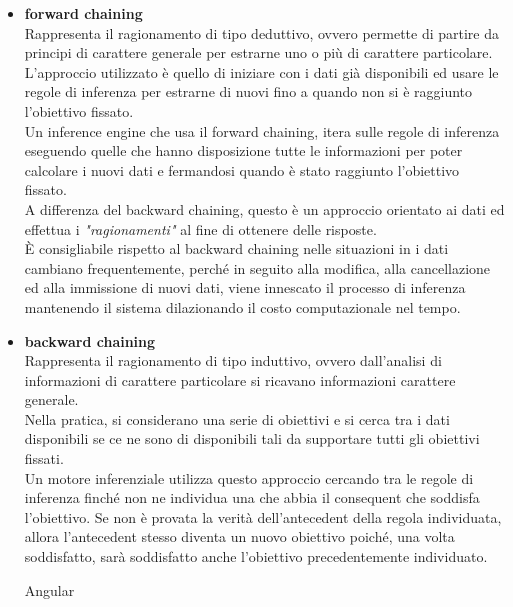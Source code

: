 \begin{itemize}
	\item \textbf{forward chaining} \\
	 Rappresenta il ragionamento di tipo deduttivo, ovvero permette di partire da principi di carattere generale per estrarne uno o più di carattere particolare.\\
	 L'approccio utilizzato è quello di iniziare con i dati già disponibili ed usare le regole di inferenza per estrarne di nuovi fino a quando non si è raggiunto l'obiettivo fissato.\\
	 Un inference engine che usa il forward chaining, itera sulle regole di inferenza eseguendo quelle che hanno disposizione tutte le informazioni per poter calcolare i nuovi dati  e fermandosi quando è stato raggiunto l'obiettivo fissato.  \\
	 A differenza del backward chaining, questo è un approccio orientato ai dati ed effettua i \textit{"ragionamenti"} al fine di ottenere delle risposte. \\
	 È consigliabile rispetto al backward chaining nelle situazioni in i dati cambiano frequentemente, perché in seguito alla modifica, alla cancellazione ed alla immissione di nuovi dati, viene innescato il processo di inferenza mantenendo il sistema dilazionando il costo computazionale nel tempo.
 
 \item \textbf{backward chaining} \\
		 Rappresenta il ragionamento di tipo induttivo, ovvero dall'analisi di informazioni di carattere particolare si ricavano informazioni carattere generale. \\
		 Nella pratica, si considerano una serie di obiettivi e si cerca tra i dati disponibili se ce ne sono di disponibili tali da supportare tutti gli obiettivi fissati.\\
		 Un motore inferenziale utilizza questo approccio cercando tra le regole di inferenza finché non ne individua una che abbia il consequent che soddisfa l'obiettivo.
		 Se non è provata la verità dell'antecedent della regola individuata, allora l'antecedent stesso diventa un nuovo obiettivo poiché, una volta soddisfatto, sarà soddisfatto anche l'obiettivo precedentemente individuato.  
		 
		 
		 
		 
		 
		
		 
		 \gls{Angular}
\end{itemize} 
 
 
 
